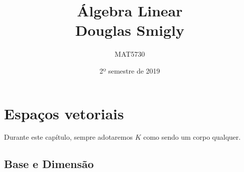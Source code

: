 \documentclass[11pt,twoside,a4paper]{book}
\title{Álgebra Linear \\  Douglas Smigly}
\author{MAT5730}
\date{2º semestre de 2019}
\begin{document}
\maketitle

\tableofcontents

\newpage

\chapter{Espaços vetoriais}

Durante este capítulo, sempre adotaremos $K$ como sendo um corpo qualquer.

\section{Base e Dimensão}
\end{document}
